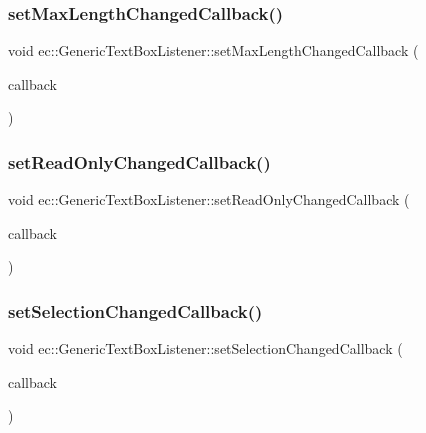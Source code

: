 \subsubsection{\texorpdfstring{set\+Max\+Length\+Changed\+Callback()}{setMaxLengthChangedCallback()}}
{\footnotesize\ttfamily void ec\+::\+Generic\+Text\+Box\+Listener\+::set\+Max\+Length\+Changed\+Callback (\begin{DoxyParamCaption}\item[{const \mbox{\hyperlink{classec_1_1_generic_text_box_listener_ae0559ffa241ec16797f0554715b7b632}{Max\+Length\+Changed\+\_\+\+Callback}} \&}]{callback }\end{DoxyParamCaption})}

\mbox{\label{classec_1_1_generic_text_box_listener_a30cb51d557af4b5fac63dd8787b190a1}} 
\subsubsection{\texorpdfstring{set\+Read\+Only\+Changed\+Callback()}{setReadOnlyChangedCallback()}}
{\footnotesize\ttfamily void ec\+::\+Generic\+Text\+Box\+Listener\+::set\+Read\+Only\+Changed\+Callback (\begin{DoxyParamCaption}\item[{const \mbox{\hyperlink{classec_1_1_generic_text_box_listener_a2046d1c27dca4b40f4bc373a3ce2be1e}{Read\+Only\+Changed\+\_\+\+Callback}} \&}]{callback }\end{DoxyParamCaption})}

\mbox{\label{classec_1_1_generic_text_box_listener_ae00c8fe6bf39e816e8dd72a93b5dc889}} 
\subsubsection{\texorpdfstring{set\+Selection\+Changed\+Callback()}{setSelectionChangedCallback()}}
{\footnotesize\ttfamily void ec\+::\+Generic\+Text\+Box\+Listener\+::set\+Selection\+Changed\+Callback (\begin{DoxyParamCaption}\item[{const \mbox{\hyperlink{classec_1_1_generic_text_box_listener_a25c554bc062fdfdc805f7aefe981a3ea}{Selection\+Changed\+\_\+\+Callback}} \&}]{callback }\end{DoxyParamCaption})}

